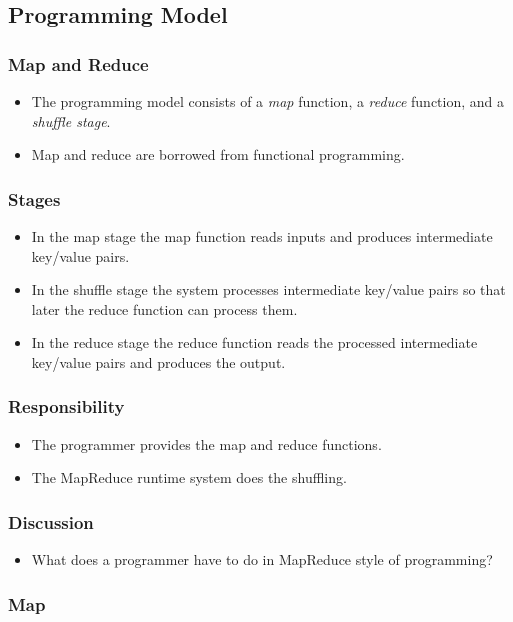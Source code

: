 \documentclass{beamer}
\begin{document}
\subsection{Programming Model}

\begin{frame}
  \frametitle{Map and Reduce}
  \begin{itemize}
  \item The programming model consists of a {\em map} function, a {\em
    reduce} function, and a {\em shuffle stage}.
  \item Map and reduce are borrowed from functional programming.
  \end{itemize}
\end{frame}

\begin{frame}
  \frametitle{Stages}
  \begin{itemize}
    \item In the map stage the map function reads inputs and produces
      intermediate key/value pairs.
    \item In the shuffle stage the system processes intermediate
      key/value pairs so that later the reduce function can process
      them.
    \item In the reduce stage the reduce function reads the processed
      intermediate key/value pairs and produces the output.
  \end{itemize}
\end{frame}

\begin{frame}
  \frametitle{Responsibility}
  \begin{itemize}
    \item The programmer provides the map and reduce functions.
    \item The MapReduce runtime system does the shuffling.
  \end{itemize}
\end{frame}

\begin{frame}
  \frametitle{Discussion}
  \begin{itemize}
    \item What does a programmer have to do in MapReduce style of
      programming?
  \end{itemize}
\end{frame}

\subsubsection{Map}
\end{document}
